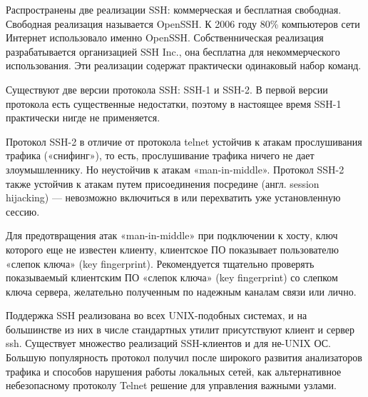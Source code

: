 Распространены две реализации SSH: коммерческая и бесплатная свободная. Свободная реализация называется OpenSSH. К 2006 году 80\% компьютеров сети Интернет использовало именно OpenSSH. Собственническая реализация разрабатывается организацией SSH Inc., она бесплатна для некоммерческого использования. Эти реализации содержат практически одинаковый набор команд.

Существуют две версии протокола SSH: SSH-1 и SSH-2. В первой версии протокола есть существенные недостатки, поэтому в настоящее время SSH-1 практически нигде не применяется.

Протокол SSH-2 в отличие от протокола telnet устойчив к атакам прослушивания трафика («снифинг»), то есть, прослушивание трафика ничего не дает злоумышленнику. Но неустойчив к атакам «man-in-middle». Протокол SSH-2 также устойчив к атакам путем присоединения посредине (англ. session hijacking) --- невозможно включиться в или перехватить уже установленную сессию.

Для предотвращения атак «man-in-middle» при подключении к хосту, ключ которого еще не известен клиенту, клиентское ПО показывает пользователю «слепок ключа» (key fingerprint). Рекомендуется тщательно проверять показываемый клиентским ПО «слепок ключа» (key fingerprint) со слепком ключа сервера, желательно полученным по надежным каналам связи или лично.

Поддержка SSH реализована во всех UNIX-подобных системах, и на большинстве из них в числе стандартных утилит присутствуют клиент и сервер ssh. Существует множество реализаций SSH-клиентов и для не-UNIX ОС. Большую популярность протокол получил после широкого развития анализаторов трафика и способов нарушения работы локальных сетей, как альтернативное небезопасному протоколу Telnet решение для управления важными узлами.
                                                                                                              


